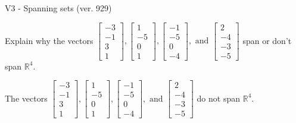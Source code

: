 \begin{exercise}
  \begin{exerciseTitle}V3 - Spanning sets (ver. 929)\end{exerciseTitle}
  \begin{exerciseStatement}
    Explain why the vectors \(\left[\begin{array}{r}
-3 \\
-1 \\
3 \\
1
\end{array}\right] , \left[\begin{array}{r}
1 \\
-5 \\
0 \\
1
\end{array}\right] , \left[\begin{array}{r}
-1 \\
-5 \\
0 \\
-4
\end{array}\right] , \text{ and } \left[\begin{array}{r}
2 \\
-4 \\
-3 \\
-5
\end{array}\right]\) span or don't span \(\mathbb{R}^4\). 
	


  \end{exerciseStatement}
  \begin{exerciseAnswer}
   The vectors \(\left[\begin{array}{r}
-3 \\
-1 \\
3 \\
1
\end{array}\right] , \left[\begin{array}{r}
1 \\
-5 \\
0 \\
1
\end{array}\right] , \left[\begin{array}{r}
-1 \\
-5 \\
0 \\
-4
\end{array}\right] , \text{ and } \left[\begin{array}{r}
2 \\
-4 \\
-3 \\
-5
\end{array}\right]\) 
  	 do not  
	span \(\mathbb{R}^4\).
  


  \end{exerciseAnswer}
\end{exercise}